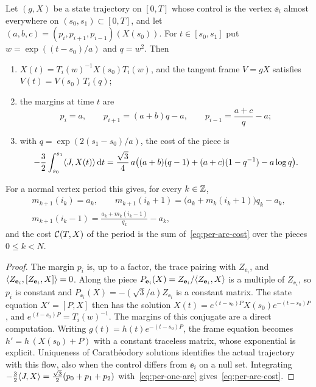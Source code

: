 \begin{lemma}\label{lem:one-arc}
Let $(g,X)$ be a state trajectory on $[0,T]$ whose control is the vertex $\ee_i$ almost
everywhere on $(s_0,s_1)\subset[0,T]$, and let $(a,b,c)=(p_i,p_{i+1},p_{i-1})(X(s_0))$. For
$t\in[s_0,s_1]$ put $w=\exp((t-s_0)/a)$ and $q=w^2$. Then
\begin{enumerate}[label=\textup{(\alph*)}]
\item $X(t)=T_i(w)^{-1}X(s_0)T_i(w)$, and the tangent frame $V=gX$ satisfies
  $V(t)=V(s_0)\,T_i(q)$;
\item the margins at time $t$ are
  \begin{equation}\label{eq:per-one-arc}
    p_i=a,\qquad p_{i+1}=(a+b)q-a,\qquad p_{i-1}=\frac{a+c}{q}-a;
  \end{equation}
\item with $q=\exp(2(s_1-s_0)/a)$, the cost of the piece is
  \begin{equation}\label{eq:per-arc-cost}
    -\frac32\int_{s_0}^{s_1}\langle J,X(t)\rangle\,\mathrm{d} t
    =\frac{\sqrt3}{4}\,a\bigl((a+b)(q-1)+(a+c)(1-q^{-1})-a\log q\bigr).
  \end{equation}
\end{enumerate}
For a normal vertex period this gives, for every $k\in\mathbb{Z}$,
\begin{gather*}
  m_{k+1}(i_k)=a_k,\qquad m_{k+1}(i_k+1)=\bigl(a_k+m_k(i_k+1)\bigr)q_k-a_k,\\
  m_{k+1}(i_k-1)=\frac{a_k+m_k(i_k-1)}{q_k}-a_k,
\end{gather*}
and the cost $\mathcal{C}(T,X)$ of the period is the sum of~\eqref{eq:per-arc-cost} over the pieces
$0\le k<N$.
\end{lemma}

\begin{proof}
The margin $p_i$ is, up to a factor, the trace pairing with $Z_{\ee_i}$, and
$\langle Z_{\mathbf{e}_i},[Z_{\mathbf{e}_i},X]\rangle=0$. Along the piece $P_{\mathbf{e}_i}(X)=Z_{\mathbf{e}_i}/\langle Z_{\mathbf{e}_i},X\rangle$ is a
multiple of $Z_{\ee_i}$, so $p_i$ is constant and $P_{\ee_i}(X)=-(\sqrt3/a)Z_{\ee_i}$ is a constant
matrix. The state equation $X'=[P,X]$ then has the solution
$X(t)=e^{(t-s_0)P}X(s_0)e^{-(t-s_0)P}$, and $e^{(t-s_0)P}=T_i(w)^{-1}$. The margins of this
conjugate are a direct computation. Writing
$g(t)=h(t)e^{-(t-s_0)P}$, the frame equation becomes $h'=h\,(X(s_0)+P)$ with a constant
traceless matrix, whose exponential is explicit. Uniqueness of Carath\'eodory solutions
identifies the actual trajectory with this flow, also when the control differs from $\ee_i$ on
a null set. Integrating $-\frac32\langle J,X\rangle=\frac{\sqrt3}{2}(p_0+p_1+p_2)$ with~\eqref{eq:per-one-arc} gives~\eqref{eq:per-arc-cost}.
\end{proof}

